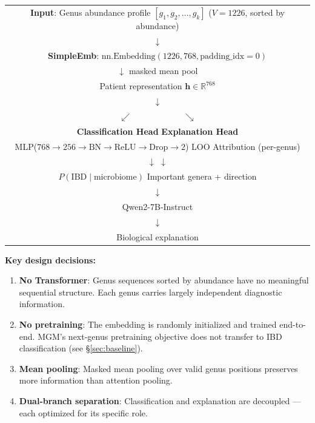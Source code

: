 \documentclass[11pt,a4paper]{article}
\begin{document}
\begin{center}
\begin{tabular}{c}
\textbf{Input}: Genus abundance profile $[g_1, g_2, \ldots, g_k]$ ($V{=}1226$, sorted by abundance) \\
$\downarrow$ \\
\textbf{SimpleEmb}: $\text{nn.Embedding}(1226, 768, \text{padding\_idx}{=}0)$ \\
$\downarrow$ masked mean pool \\
Patient representation $\mathbf{h} \in \mathbb{R}^{768}$ \\
$\downarrow$ \\
$\swarrow \qquad \qquad \qquad \searrow$ \\
\textbf{Classification Head} \hspace{2cm} \textbf{Explanation Head} \\
MLP($768{\rightarrow}256{\rightarrow}\text{BN}{\rightarrow}\text{ReLU}{\rightarrow}\text{Drop}{\rightarrow}2$) \quad LOO Attribution (per-genus) \\
$\downarrow$ \hspace{3.5cm} $\downarrow$ \\
$P(\text{IBD} \mid \text{microbiome})$ \hspace{2.3cm} Important genera + direction \\
\hspace{4.3cm} $\downarrow$ \\
\hspace{3.3cm} Qwen2-7B-Instruct \\
\hspace{3.3cm} $\downarrow$ \\
\hspace{2.3cm} Biological explanation
\end{tabular}
\end{center}

\textbf{Key design decisions:}
\begin{enumerate}
  \item \textbf{No Transformer}: Genus sequences sorted by abundance have no meaningful sequential structure. Each genus carries largely independent diagnostic information.
  \item \textbf{No pretraining}: The embedding is randomly initialized and trained end-to-end. MGM's next-genus pretraining objective does not transfer to IBD classification (see \S\ref{sec:baseline}).
  \item \textbf{Mean pooling}: Masked mean pooling over valid genus positions preserves more information than attention pooling.
  \item \textbf{Dual-branch separation}: Classification and explanation are decoupled --- each optimized for its specific role.
\end{enumerate}
\end{document}
